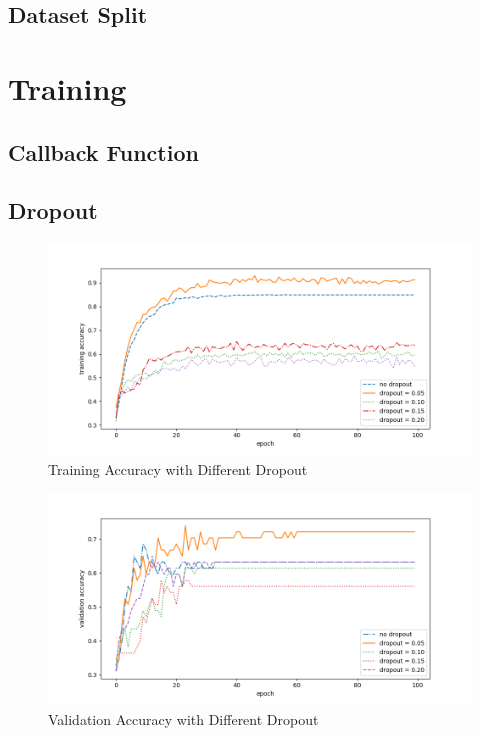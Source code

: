 \documentclass{article}
\begin{document}
\subsection{Dataset Split}









\section{Training}

\subsection{Callback Function}

\subsection{Dropout}

\begin{figure}[h]
\centering
\includegraphics[scale=0.5]{DataAnalysis/TrainingAccuracyDropout.png}
\caption{Training Accuracy with Different Dropout}
\label{fig:Training Accuracy with Different Dropout}
\end{figure}


\begin{figure}[h]
\centering
\includegraphics[scale=0.5]{DataAnalysis/ValidationAccuracyDropout.png}
\caption{Validation Accuracy with Different Dropout}
\label{fig:Validation Accuracy with Different Dropout}
\end{figure}
\end{document}
